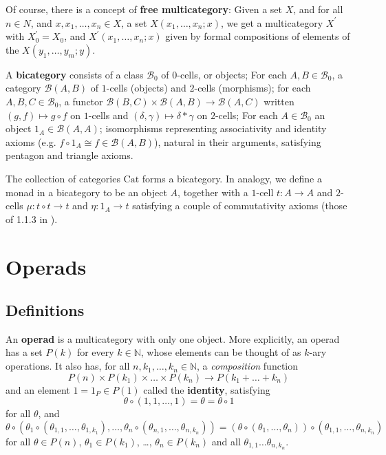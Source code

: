 \documentclass{amsbook}
\begin{document}
  Of course, there is a concept of \textbf{free multicategory}: Given a set $ X $, and for all $ n \in N $, and $ x, x_1, \dots, x_n \in X $, a set $ X(x_1, \dots, x_n ; x) $, we get a multicategory $ X^\prime $ with $ X^\prime_0 = X_0 $, and $ X^\prime(x_1, \dots, x_n; x) $ given by formal compositions of elements of the $ X(y_1, \dots, y_m; y) $.

  A \textbf{bicategory} consists of a class $ \mathcal B_0 $ of $ 0 $-cells, or objects; For each $ A, B \in \mathcal B_0 $, a category $ \mathcal B(A, B) $ of $ 1 $-cells (objects) and $ 2 $-cells (morphisms); for each $ A, B, C \in \mathcal B_0 $, a functor $ \mathcal B(B, C) \times \mathcal B(A, B) \to \mathcal B(A, C) $ written $ (g, f) \mapsto g \circ f $ on $ 1 $-cells and $ (\delta, \gamma) \mapsto \delta * \gamma $ on $ 2 $-cells; For each $ A \in \mathcal B_0 $ an object $ 1_A \in \mathcal B(A, A) $; isomorphisms representing associativity and identity axioms (e.g. $ f \circ 1_A \cong f \in \mathcal B(A, B) $), natural in their arguments, satisfying pentagon and triangle axioms.

  The collection of categories $ \mathrm{Cat} $ forms a bicategory. In analogy, we define a monad in a bicategory to be an object $ A $, together with a $ 1 $-cell $ t: A \to A $ and $ 2 $-cells $ \mu: t \circ t \to t $ and $ \eta: 1_A \to t $ satisfying a couple of commutativity axioms (those of 1.1.3 in \cite{higher-operads-higher-categories}).

  \section{Operads}
  \subsection{Definitions}
  An \textbf{operad} is a multicategory with only one object. More explicitly, an operad has a set $ P(k) $ for every $ k \in \mathbb N $, whose elements can be thought of as $ k $-ary operations. It also has, for all $ n, k_1, \dots, k_n \in \mathbb N $, a \textit{composition} function
  \[ P(n) \times P(k_1) \times \dots \times P(k_n) \to P(k_1 + \dots + k_n) \]
  and an element $ 1 = 1_P \in P(1) $ called the \textbf{identity}, satisfying
  \[ \theta \circ (1, 1, \dots, 1) = \theta = \theta \circ 1 \]
  for all $ \theta $, and
  \[ \theta \circ(\theta_1 \circ(\theta_{1, 1}, \dots, \theta_{1, k_1}), \dots, \theta_n \circ (\theta_{n, 1}, \dots, \theta_{n, k_n})) = (\theta \circ (\theta_1, \dots, \theta_n)) \circ (\theta_{1, 1}, \dots, \theta_{n, k_n}) \]
  for all $ \theta \in P(n) $, $ \theta_1 \in P(k_1) $, \dots, $ \theta_n \in P(k_n) $ and all $ \theta_{1, 1} \dots \theta_{n, k_n} $.
\end{document}
